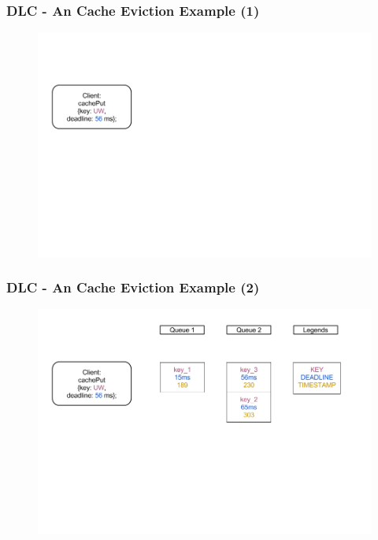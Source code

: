 \documentclass{beamer}
\begin{document}
\begin{frame}
  \frametitle{DLC - An Cache Eviction Example (1)}
  \begin{figure}
    \begin{center}
      \centerline{\includegraphics[scale=0.33]{img/DLC_V5_1.png}}
    \end{center}
  \end{figure}
\end{frame}


\begin{frame}
  \frametitle{DLC - An Cache Eviction Example (2)}
  \begin{figure}
    \begin{center}
      \centerline{\includegraphics[scale=0.33]{img/DLC_V5_2.png}}
    \end{center}
  \end{figure}
\end{frame}
\end{document}
